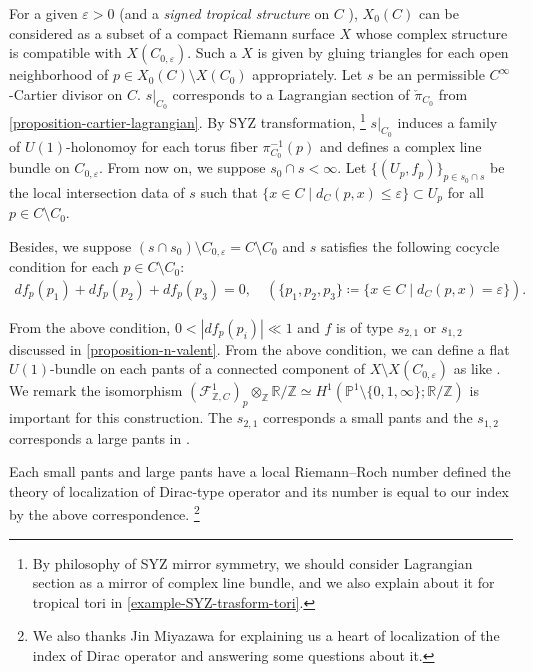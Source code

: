 \documentclass[a4paper,dvipdfmx,reqno,12pt]{amsart}
\theoremstyle{definition}
\newcommand{\deq}{\coloneqq}
\newcommand{\vep}{\varepsilon}%
\newcommand{\myfootnote}[1]{\hspace{-5pt}\footnote{#1}}
\numberwithin{equation}{section}
\begin{document}
For a given $\vep>0$ (and a \emph{signed tropical structure}
on $C$ \cite{MR3076066}), 
$X_0(C)$ can be considered as a subset of a compact 
Riemann surface $X$ whose complex structure is 
compatible with $X(C_{0,\vep})$. 
Such a $X$ is given by gluing triangles for 
each open neighborhood of $p\in X_0(C)\setminus X(C_0)$
appropriately.
Let $s$ be an permissible $C^{\infty}$-Cartier divisor on $C$.
$s|_{C_0}$ corresponds to a Lagrangian section of 
$\check{\pi}_{C_0}$ from 
\cref{proposition-cartier-lagrangian}.
By SYZ transformation,
\myfootnote{By philosophy of SYZ mirror symmetry,
we should consider Lagrangian section 
as a mirror of complex line bundle,
and we also explain about it for tropical tori in 
\cref{example-SYZ-trasform-tori}.
}
$s|_ {C_0}$ induces a family of $U(1)$-holonomoy for
each torus fiber $\pi_{C_0}^{-1}(p)$ and defines a 
complex line bundle on $C_{0,\vep}$. From now on, 
we suppose $s_0\cap s<\infty$. 
Let $\{(U_p, f_p)\}_{p\in s_0\cap s}$ be the local intersection data 
of $s$ such that 
$\{x\in C\mid d_C(p,x)\leq \vep\}\subset U_p$ for
all $p\in C\setminus C_0$.

Besides, we suppose 
$(s\cap s_0)\setminus C_{0,\vep}=C\setminus C_0$ and $s$ satisfies the following cocycle
condition for each $p\in C\setminus C_0$:
\begin{align}
df_p(p_1)+df_p(p_2)+df_p(p_3)=0,\quad 
(\{p_1,p_2,p_3\}\deq \{x\in C\mid d_C(p,x)=\vep\}).
\end{align}

From the above condition, $0<|df_p(p_i)| \ll 1$ and
$f$ is of type $s_{2,1}$ or $s_{1,2}$ discussed
in \cref{proposition-n-valent}.
From the above condition, we can define 
a flat $U(1)$-bundle on each pants of a 
connected component of $X\setminus X(C_{0,\vep})$
as like \cite[6.1.3]{MR2676658}.
We remark the isomorphism
$(\mathcal{F}_{\mathbb{Z},C}^{1})_p\otimes_{\mathbb{Z}}
\mathbb{R}/\mathbb{Z}\simeq 
H^1(\mathbb{P}^{1}\setminus 
\{0,1,\infty\};\mathbb{R}/\mathbb{Z})$
is important for this construction.
The $s_{2,1}$
corresponds a small pants and the $s_{1,2}$
corresponds a large pants in 
\cite[Definition 6.3]{MR2676658}.


Each small pants and large pants have a local 
Riemann--Roch number defined the theory of 
localization of Dirac-type operator and its 
number is equal 
to our index by the above correspondence.
\myfootnote{
We also thanks Jin Miyazawa
for explaining us a heart of localization of 
the index of Dirac operator and answering some 
questions about it.}
\end{document}
